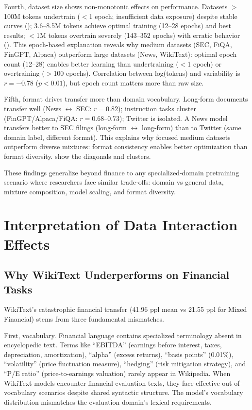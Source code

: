 Fourth, dataset size shows non-monotonic effects on performance. Datasets $>$100M tokens undertrain ($<$1 epoch; insufficient data exposure) despite stable curves (); 3.6–8.5M tokens achieve optimal training (12–28 epochs) and best results; $<$1M tokens overtrain severely (143–352 epochs) with erratic behavior (). This epoch-based explanation reveals why medium datasets (SEC, FiQA, FinGPT, Alpaca) outperform large datasets (News, WikiText): optimal epoch count (12–28) enables better learning than undertraining ($<$1 epoch) or overtraining ($>$100 epochs). Correlation between log(tokens) and variability is $r=-0.78$ ($p<0.01$), but epoch count matters more than raw size.

Fifth, format drives transfer more than domain vocabulary. Long‑form documents transfer well (News $\leftrightarrow$ SEC: $r=0.82$); instruction tasks cluster (FinGPT/Alpaca/FiQA: $r=0.68$–$0.73$); Twitter is isolated. A News model transfers better to SEC filings (long‑form $\leftrightarrow$ long‑form) than to Twitter (same domain label, different format). This explains why focused medium datasets outperform diverse mixtures: format consistency enables better optimization than format diversity.  show the diagonals and clusters.

These findings generalize beyond finance to any specialized‑domain pretraining scenario where researchers face similar trade‑offs: domain vs general data, mixture composition, model scaling, and format diversity.

\section{Interpretation of Data Interaction Effects}

\subsection{Why WikiText Underperforms on Financial Tasks}

WikiText's catastrophic financial transfer (41.96 ppl mean vs 21.55 ppl for Mixed Financial) stems from three fundamental mismatches.

First, vocabulary. Financial language contains specialized terminology absent in encyclopedic text. Terms like ``EBITDA'' (earnings before interest, taxes, depreciation, amortization), ``alpha'' (excess returns), ``basis points'' (0.01\%), ``volatility'' (price fluctuation measure), ``hedging'' (risk mitigation strategy), and ``P/E ratio'' (price-to-earnings valuation) rarely appear in Wikipedia. When WikiText models encounter financial evaluation texts, they face effective out-of-vocabulary scenarios despite shared syntactic structure. The model's vocabulary distribution mismatches the evaluation domain's lexical requirements.

